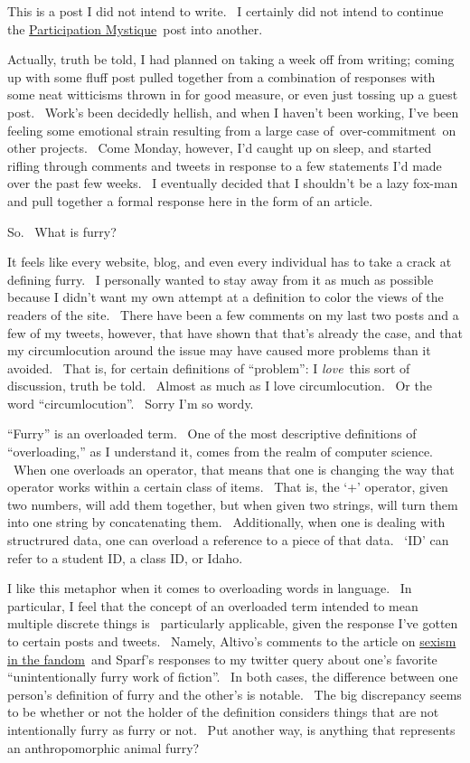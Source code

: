 This is a post I did not intend to write. ~I certainly did not intend to
continue the
\href{http://adjectivespecies.com/2012/01/25/participation-mystique/}{Participation
Mystique}~post into another.

Actually, truth be told, I had planned on taking a week off from
writing; coming up with some fluff post pulled together from a
combination of responses with some neat witticisms thrown in for good
measure, or even just tossing up a guest post. ~Work's been decidedly
hellish, and when I haven't been working, I've been feeling some
emotional strain resulting from a large case of~over-commitment~on other
projects. ~Come Monday, however, I'd caught up on sleep, and started
rifling through comments and tweets in response to a few statements I'd
made over the past few weeks. ~I eventually decided that I shouldn't be
a lazy fox-man and pull together a formal response here in the form of
an article.

So. ~What is furry?

It feels like every website, blog, and even every individual has to take
a crack at defining furry. ~I personally wanted to stay away from it as
much as possible because I didn't want my own attempt at a definition to
color the views of the readers of the site. ~There have been a few
comments on my last two posts and a few of my tweets, however, that have
shown that that's already the case, and that my circumlocution around
the issue may have caused more problems than it avoided. ~That is, for
certain definitions of ``problem'': I \emph{love}~this sort of
discussion, truth be told. ~Almost as much as I love circumlocution. ~Or
the word ``circumlocution''. ~Sorry I'm so wordy.

``Furry'' is an overloaded term. ~One of the most descriptive
definitions of ``overloading,'' as I understand it, comes from the realm
of computer science. ~When one overloads an operator, that means that
one is changing the way that operator works within a certain class of
items. ~That is, the `+' operator, given two numbers, will add them
together, but when given two strings, will turn them into one string by
concatenating them. ~Additionally, when one is dealing with structrured
data, one can overload a reference to a piece of that data. ~`ID' can
refer to a student ID, a class ID, or Idaho.

I like this metaphor when it comes to overloading words in language. ~In
particular, I feel that the concept of an overloaded term intended to
mean multiple discrete things is ~particularly applicable, given the
response I've gotten to certain posts and tweets. ~Namely, Altivo's
comments to the article on
\href{http://adjectivespecies.com/2012/02/01/eighty-twenty/}{sexism in
the fandom}~and Sparf's responses to my twitter query about one's
favorite ``unintentionally furry work of fiction''. ~In both cases, the
difference between one person's definition of furry and the other's is
notable. ~The big discrepancy seems to be whether or not the holder of
the definition considers things that are not intentionally furry as
furry or not. ~Put another way, is anything that represents an
anthropomorphic animal furry?

